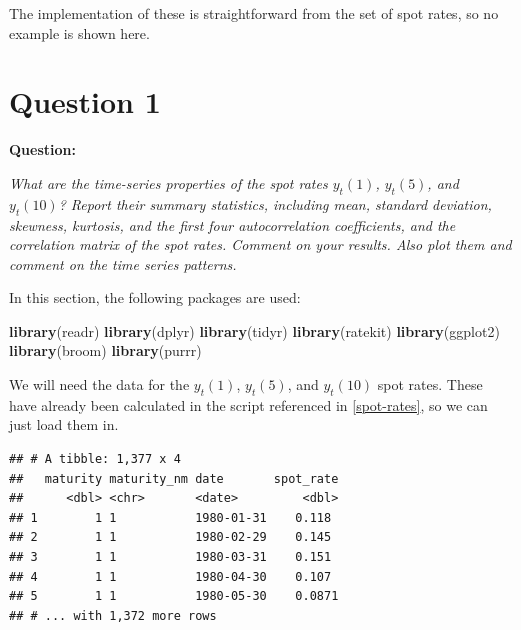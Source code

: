 \documentclass[]{book}
\newenvironment{Shaded}{\begin{snugshade}}{\end{snugshade}}
\newcommand{\KeywordTok}[1]{\textcolor[rgb]{0.13,0.29,0.53}{\textbf{#1}}}
\newcommand{\NormalTok}[1]{#1}
\newcommand{\OperatorTok}[1]{\textcolor[rgb]{0.81,0.36,0.00}{\textbf{#1}}}
\newcommand{\StringTok}[1]{\textcolor[rgb]{0.31,0.60,0.02}{#1}}
\theoremstyle{definition}
\theoremstyle{definition}
\theoremstyle{definition}
\theoremstyle{remark}
\begin{document}
The implementation of these is straightforward from the set of spot
rates, so no example is shown here.

\hypertarget{q1}{%
\chapter{Question 1}\label{q1}}

\textbf{Question:}

\emph{What are the time-series properties of the spot rates \(y_t(1)\),
\(y_t(5)\), and \(y_t(10)\)? Report their summary statistics, including
mean, standard deviation, skewness, kurtosis, and the first four
autocorrelation coefficients, and the correlation matrix of the spot
rates. Comment on your results. Also plot them and comment on the time
series patterns.}

In this section, the following packages are used:

\begin{Shaded}
\begin{Highlighting}[]
\KeywordTok{library}\NormalTok{(readr)}
\KeywordTok{library}\NormalTok{(dplyr)}
\KeywordTok{library}\NormalTok{(tidyr)}
\KeywordTok{library}\NormalTok{(ratekit)}
\KeywordTok{library}\NormalTok{(ggplot2)}
\KeywordTok{library}\NormalTok{(broom)}
\KeywordTok{library}\NormalTok{(purrr)}
\end{Highlighting}
\end{Shaded}

We will need the data for the \(y_t(1)\), \(y_t(5)\), and \(y_t(10)\)
spot rates. These have already been calculated in the script referenced
in \ref{spot-rates}, so we can just load them in.

\begin{Shaded}
\end{Shaded}

\begin{verbatim}
## # A tibble: 1,377 x 4
##   maturity maturity_nm date       spot_rate
##      <dbl> <chr>       <date>         <dbl>
## 1        1 1           1980-01-31    0.118 
## 2        1 1           1980-02-29    0.145 
## 3        1 1           1980-03-31    0.151 
## 4        1 1           1980-04-30    0.107 
## 5        1 1           1980-05-30    0.0871
## # ... with 1,372 more rows
\end{verbatim}
\end{document}
